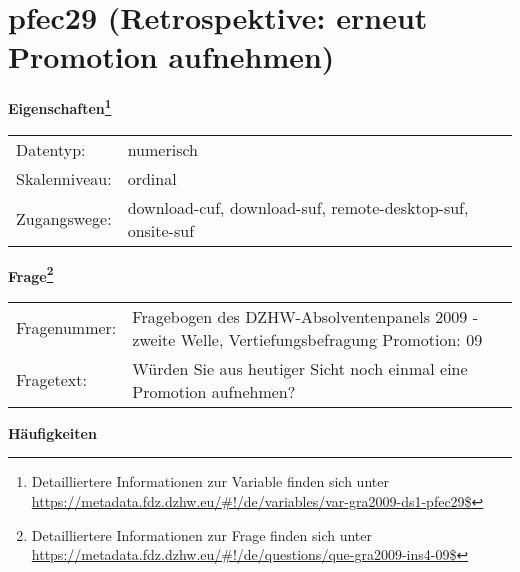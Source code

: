 
    \setcounter{footnote}{0}

    \vspace*{-1.8cm}
	\section{pfec29 (Retrospektive: erneut Promotion aufnehmen)}
	\label{section:pfec29}



    \vspace*{0.5cm}
    \noindent\textbf{Eigenschaften\footnote{Detailliertere Informationen zur Variable finden sich unter
		\url{https://metadata.fdz.dzhw.eu/\#!/de/variables/var-gra2009-ds1-pfec29$}}}\\
	\begin{tabularx}{\hsize}{@{}lX}
	Datentyp: & numerisch \\
	Skalenniveau: & ordinal \\
	Zugangswege: &
	  download-cuf, 
	  download-suf, 
	  remote-desktop-suf, 
	  onsite-suf
 \\
    \end{tabularx}



				\vspace*{0.5cm}
                \noindent\textbf{Frage\footnote{Detailliertere Informationen zur Frage finden sich unter
		              \url{https://metadata.fdz.dzhw.eu/\#!/de/questions/que-gra2009-ins4-09$}}}\\
				\begin{tabularx}{\hsize}{@{}lX}
					Fragenummer: &
					  Fragebogen des DZHW-Absolventenpanels 2009 - zweite Welle, Vertiefungsbefragung Promotion:
					  09
 \\
					Fragetext: & Würden Sie aus heutiger Sicht noch einmal eine Promotion aufnehmen? \\
				\end{tabularx}





        		\vspace*{0.5cm}
                \noindent\textbf{Häufigkeiten}

